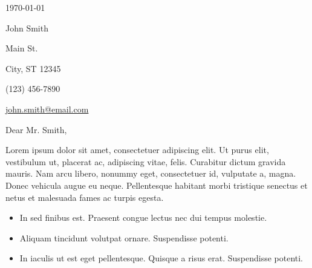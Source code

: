 \documentclass[12pt]{article}
\newcommand{\itemspace}{\vspace{0.5em}}
\begin{document}
\maketitle

\vspace{-2.8mm}
\noindent\hrulefill

\vspace{-4.5mm}
\noindent\hrulefill

\itemspace

\vspace{3em}

\noindent\monthdayyeardate\today

\vspace{3em}

\noindent John Smith

 Main St.

\noindent City, ST 12345

\noindent (123) 456-7890

\noindent \href{mailto:john.smith@email.com}{john.smith@email.com}

\vspace{3em}

\noindent Dear Mr. Smith,

\itemspace

Lorem ipsum dolor sit amet, consectetuer adipiscing elit.
Ut purus elit, vestibulum ut, placerat ac, adipiscing vitae, felis.
Curabitur dictum gravida mauris.
Nam arcu libero, nonummy eget, consectetuer id, vulputate a, magna.
Donec vehicula augue eu neque. Pellentesque habitant morbi tristique
senectus et netus et malesuada fames ac turpis egesta.

\itemspace

\begin{itemize}[nolistsep]
    \item In sed finibus est. Praesent congue lectus nec dui tempus molestie.

    \itemspace

    \item Aliquam tincidunt volutpat ornare. Suspendisse potenti.

    \itemspace

    \item In iaculis ut est eget pellentesque. Quisque a risus erat. Suspendisse potenti.
\end{itemize}
\end{document}
